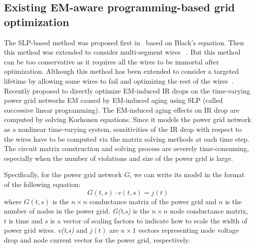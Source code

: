 \subsection{Existing EM-aware programming-based grid optimization}
 \label{subsec:exist_pgfix}
 The SLP-based method was proposed first in~\cite{Tan:DAC'99} based on Black's equation. Then this method was extended to consider multi-segment wires ~\cite{ZhouSun:ASPDAC'18}. But this method can be too conservative as it requires all the wires to be immortal after optimization. Although this method has been extended to consider a targeted lifetime by allowing some wires to fail and optimizing the rest of the wires~\cite{ZhouSun:TVLSI'19}.  Recently \cite{Sukharev:2019pg} proposed to directly optimize EM-induced IR drops on the time-varying power grid networks EM caused by EM-induced aging using SLP (called successive linear programming).  The EM-induced aging effects on IR drop are computed by solving Korhonen equations.  Since it models the power grid network as a nonlinear time-varying system, sensitivities of the IR drop with respect to the wires have to be computed via the matrix solving methods at each time step. The circuit matrix construction and solving process are severely time-consuming, especially when the number of violations and size of the power grid is large.
 
Specifically, for the power grid network $G$, we can write its model in the format of the following equation:
\begin{equation}
 	\label{eq:gv=i}
 	G(t,s)\cdot v(t,s)= j(t)
      \end{equation}
where $G(t,s)$ is the $ n \times n$ conductance matrix of the power grid and $n$ is the number of nodes in the power grid.  \textit{G(t,s)} is the $n\times n$ node conductance matrix, $t$ is time and $s$ is a vector of scaling factors to indicate how to scale the width of power grid wires.  \textit{v(t,s)} and $j(t)$  are $n\times 1$ vectors representing node voltage drop and node current vector for the power grid, respectively. 

